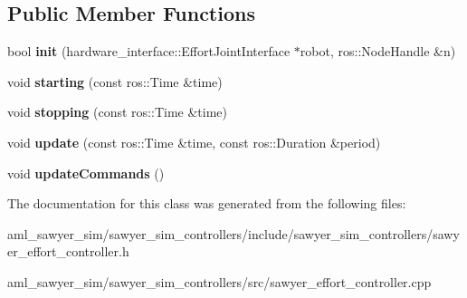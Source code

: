 \subsection*{Public Member Functions}
\begin{DoxyCompactItemize}
\item 
\hypertarget{classsawyer__sim__controllers_1_1_sawyer_effort_controller_ad08b65539948eaedea50e31d68f8278a}{bool {\bfseries init} (hardware\-\_\-interface\-::\-Effort\-Joint\-Interface $\ast$robot, ros\-::\-Node\-Handle \&n)}\label{classsawyer__sim__controllers_1_1_sawyer_effort_controller_ad08b65539948eaedea50e31d68f8278a}

\item 
\hypertarget{classsawyer__sim__controllers_1_1_sawyer_effort_controller_a89f1a7a96d4939966a14e01727aea706}{void {\bfseries starting} (const ros\-::\-Time \&time)}\label{classsawyer__sim__controllers_1_1_sawyer_effort_controller_a89f1a7a96d4939966a14e01727aea706}

\item 
\hypertarget{classsawyer__sim__controllers_1_1_sawyer_effort_controller_a5eb5968b204ff804db1297b430e5eb27}{void {\bfseries stopping} (const ros\-::\-Time \&time)}\label{classsawyer__sim__controllers_1_1_sawyer_effort_controller_a5eb5968b204ff804db1297b430e5eb27}

\item 
\hypertarget{classsawyer__sim__controllers_1_1_sawyer_effort_controller_a2154d6f3790f34189031717939b9d47e}{void {\bfseries update} (const ros\-::\-Time \&time, const ros\-::\-Duration \&period)}\label{classsawyer__sim__controllers_1_1_sawyer_effort_controller_a2154d6f3790f34189031717939b9d47e}

\item 
\hypertarget{classsawyer__sim__controllers_1_1_sawyer_effort_controller_a7ee5cdce878fbb4f781ce1c6e0da3366}{void {\bfseries update\-Commands} ()}\label{classsawyer__sim__controllers_1_1_sawyer_effort_controller_a7ee5cdce878fbb4f781ce1c6e0da3366}

\end{DoxyCompactItemize}


The documentation for this class was generated from the following files\-:\begin{DoxyCompactItemize}
\item 
aml\-\_\-sawyer\-\_\-sim/sawyer\-\_\-sim\-\_\-controllers/include/sawyer\-\_\-sim\-\_\-controllers/sawyer\-\_\-effort\-\_\-controller.\-h\item 
aml\-\_\-sawyer\-\_\-sim/sawyer\-\_\-sim\-\_\-controllers/src/sawyer\-\_\-effort\-\_\-controller.\-cpp\end{DoxyCompactItemize}
